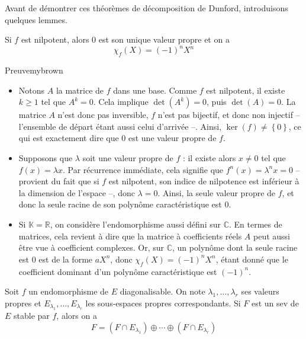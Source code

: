     Avant de démontrer ces théorèmes de décomposition de Dunford, introduisons quelques lemmes.

    \begin{lem}{}{}
        Si $f$ est nilpotent, alors $0$ est son unique valeur propre et on a 
        \[ \chi_f(X) = (-1)^n X^n \]  
    \end{lem}

    \begin{demo}{Preuve}{mybrown}
        \begin{itemize}
            \item Notons $A$ la matrice de $f$ dans une base. Comme $f$ est nilpotent, il existe $k \geq 1$ tel que $A^k = 0$. Cela implique $\det(A^k) = 0$, puis $\det(A) = 0$. La matrice $A$ n’est donc pas inversible, $f$ n’est pas bijectif, et donc non injectif -- l’ensemble de départ étant aussi celui d’arrivée --. Ainsi, $\ker(f) \neq \left\{0\right\}$, ce qui est exactement dire que $0$ est une valeur propre de $f$. 
            \item Supposons que $\lambda$ soit une valeur propre de $f$ : il existe alors $x \neq 0$ tel que $f(x) = \lambda x$. Par récurrence immédiate, cela signifie que $f^n(x) = \lambda^n x = 0$ -- provient du fait que si $f$ est nilpotent, son indice de nilpotence est inférieur à la dimension de l’espace --, donc $\lambda = 0$. Ainsi, la seule valeur propre de $f$, et donc la seule racine de son polynôme caractéristique est $0$. 
            \item Si $\mathbb{K} = \mathbb{R}$, on considère l’endomorphisme aussi défini sur $\mathbb{C}$. En termes de matrices, cela revient à dire que la matrice à coefficients réels $A$ peut aussi être vue à coefficient complexes. Or, sur $\mathbb{C}$, un polynôme dont la seule racine est $0$ est de la forme $a X^n$, donc $\chi_f(X) = (-1)^n X^n$, étant donné que le coefficient dominant d’un polynôme caractéristique est $(-1)^n$.
        \end{itemize}
    \end{demo}

    \begin{lem}{}{}
        Soit $f$ un endomorphisme de $E$ diagonalisable. On note $\lambda_1,\ldots, \lambda_r$ ses valeurs propres et $E_{\lambda_1}, \ldots, E_{\lambda_r}$ les sous-espaces propres correspondants. Si $F$ est un sev de $E$ stable par $f$, alors on a 
        \[ F = (F \cap E_{\lambda_1}) \oplus \cdots \oplus (F \cap E_{\lambda_{r}}) \]    
    \end{lem}

